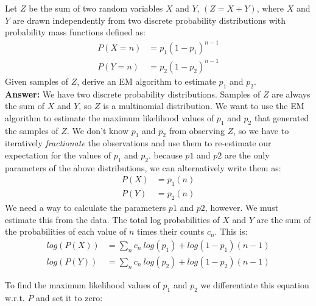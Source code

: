 \documentclass[11pt]{article}
\begin{document}
Let $Z$ be the sum of two random variables $X$ and $Y$, $(Z=X+Y)$, where $X$ and $Y$ are drawn independently from two discrete probability distributions with probability mass functions defined as:
\begin{align}
P(X=n) &= p_1(1-p_1)^{n-1}\\
P(Y=n) &= p_2(1-p_2)^{n-1}
\end{align}
Given samples of $Z$, derive an EM algorithm to estimate $p_1$ and $p_2$.
\\[5pt]\textbf{Answer:}
We have two discrete probability distributions. Samples of $Z$ are always the sum of $X$ and $Y$, so $Z$ is a multinomial distribution. We want to use the EM algorithm to estimate the maximum likelihood values of $p_1$ and $p_2$ that generated the samples of $Z$. We don't know $p_1$ and $p_2$ from observing $Z$, so we have to iteratively \textit{fractionate} the observations and use them to re-estimate our expectation for the values of $p_1$ and $p_2$. because $p1$ and $p2$ are the only parameters of the above distributions, we can alternatively write them as:
\begin{align}
P(X) &= p_1(n)\label{pX}\\
P(Y) &= p_2(n)\label{pY}
\end{align}
We need a way to calculate the parameters $p1$ and $p2$, however. We must estimate this from the data. The total log probabilities of $X$ and $Y$ are the sum of the probabilities of each value of $n$ times their counts $c_n$. This is:
\begin{align}
log(P(X)) &= \sum_n c_n \ log(p_1)  + log(1 - p_1)(n - 1) \\
log(P(Y)) &= \sum_n c_n \ log(p_2)  + log(1 - p_2)(n - 1)
\end{align}

To find the maximum likelihood values of $p_1$ and $p_2$ we differentiate this equation w.r.t. $P$ and set it to zero:
\end{document}
